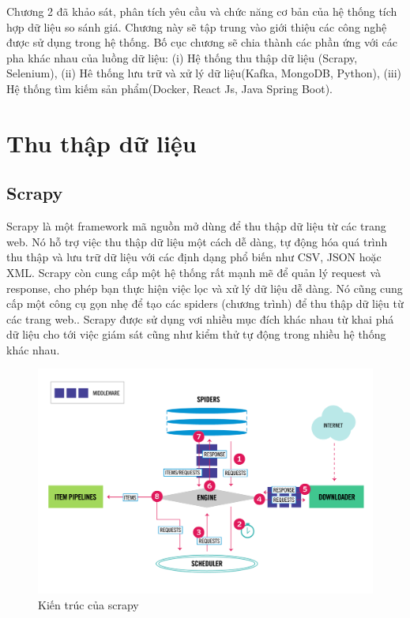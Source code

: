 \documentclass[../DoAn.tex]{subfiles}
\begin{document}
Chương 2 đã khảo sát, phân tích yêu cầu và chức năng cơ bản của hệ thống tích hợp dữ liệu so sánh giá. Chương này sẽ tập trung vào giới thiệu các công nghệ được sử dụng trong hệ thống. Bố cục chương sẽ chia thành các phần ứng với các pha khác nhau của luồng dữ liệu: (i) Hệ thống thu thập dữ liệu (Scrapy, Selenium), (ii) Hê thống lưu trữ và xử lý dữ liệu(Kafka, MongoDB, Python), (iii) Hệ thống tìm kiếm sản phẩm(Docker, React Js, Java Spring Boot).

\section{Thu thập dữ liệu}
\label{section:3.1}
\subsection{Scrapy}
\label{subsection:3.1.1}
Scrapy là một framework mã nguồn mở dùng để thu thập dữ liệu từ các trang web. Nó hỗ trợ việc thu thập dữ liệu một cách dễ dàng, tự động hóa quá trình thu thập và lưu trữ dữ liệu với các định dạng phổ biến như CSV, JSON hoặc XML. Scrapy còn cung cấp một hệ thống rất mạnh mẽ để quản lý request và response, cho phép bạn thực hiện việc lọc và xử lý dữ liệu dễ dàng. Nó cũng cung cấp một công cụ gọn nhẹ để tạo các spiders (chương trình) để thu thập dữ liệu từ các trang web.. Scrapy được sử dụng vơi nhiều mục đích khác nhau từ khai phá dữ liệu cho tới việc giám sát cũng như kiểm thử tự động trong nhiều hệ thống khác nhau.

\begin{figure}[H]
    \centering
    \includegraphics[scale=0.32]{Hinhve/scrapy_architecture.png}
    \caption{Kiến trúc của scrapy}
    \label{fig:my_label2}
\end{figure}
\end{document}
